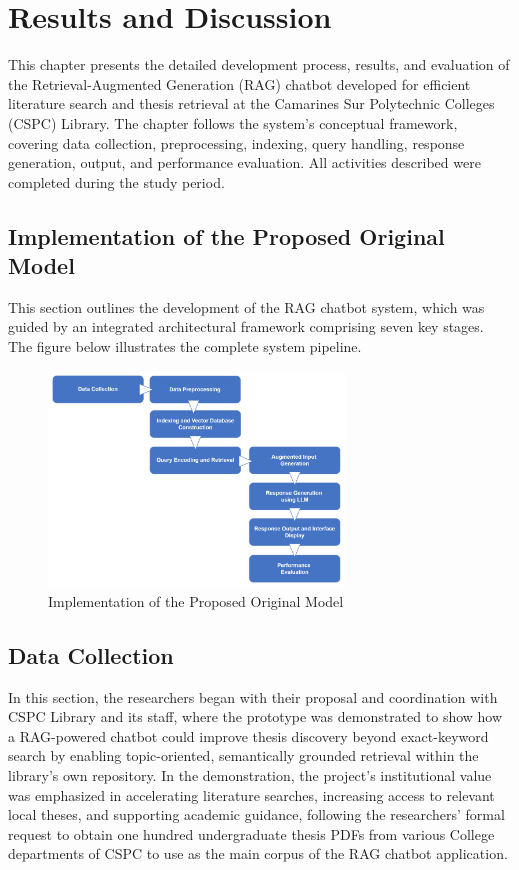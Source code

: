 
\chapter{Results and Discussion}
\begin{refsection}

This chapter presents the detailed development process, results, and evaluation of the Retrieval-Augmented Generation (RAG) chatbot developed for efficient literature search and thesis retrieval at the Camarines Sur Polytechnic Colleges (CSPC) Library. The chapter follows the system’s conceptual framework, covering data collection, preprocessing, indexing, query handling, response generation, output, and performance evaluation. All activities described were completed during the study period.

\section{Implementation of the Proposed Original Model}
This section outlines the development of the RAG chatbot system, which was guided by an integrated architectural framework comprising seven key stages. The figure below illustrates the complete system pipeline.

\begin{figure}[h]
    \centering
    \includegraphics[width=0.7\textwidth]{figures/framework.png}
    \caption{Implementation of the Proposed Original Model}
\end{figure}

\section{Data Collection}
In this section, the researchers began with their proposal and coordination with CSPC Library and its staff, where the prototype was demonstrated to show how a RAG-powered chatbot could improve thesis discovery beyond exact-keyword search by enabling topic-oriented, semantically grounded retrieval within the library’s own repository. In the demonstration, the project’s institutional value was emphasized in accelerating literature searches, increasing access to relevant local theses, and supporting academic guidance, following the researchers' formal request to obtain one hundred undergraduate thesis PDFs from various College departments of CSPC to use as the main corpus of the RAG chatbot application.


\end{refsection}
